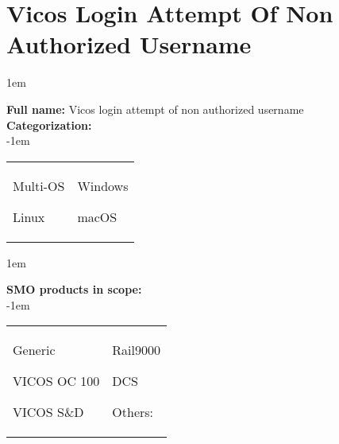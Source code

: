 
%
%

\section{Vicos Login Attempt Of Non Authorized Username}
\label{15203}

\openup 1em

\textbf{Full name:} Vicos login attempt of non authorized username\hrulefill \\
{\bf Categorization:} \\

\openup -1em
\vspace{-3em}

\begin{tabular}{p{}p{}}

\begin{todolist}
  	\item Multi-OS
	\item Linux
\end{todolist}
&
\begin{todolist}
	\item[\done] Windows
	\item macOS
\end{todolist}

\end{tabular}

\openup 1em

{\bf SMO products in scope:} \\

\openup -1em
\vspace{-3em}

\begin{tabular}{p{}p{}}

\begin{todolist}
  \item Generic
  \item[\done] VICOS OC 100
  \item VICOS S\&D
\end{todolist}
&
\begin{todolist}
  \item Rail9000
  \item DCS
  \item Others: \hrulefill
\end{todolist}

\end{tabular}

